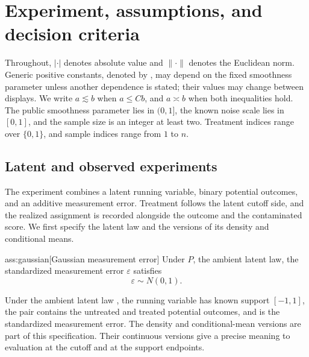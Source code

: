 \section{Experiment, assumptions, and decision criteria}

Throughout, \(\lvert\cdot\rvert\) denotes absolute value and \(\|\cdot\|\) denotes the Euclidean norm. Generic positive constants, denoted by , may depend on the fixed smoothness parameter unless another dependence is stated; their values may change between displays. We write \(a\lesssim b\) when \(a\le Cb\), and \(a\asymp b\) when both inequalities hold. The public smoothness parameter  lies in \((0,1]\), the known noise scale  lies in \([0,1]\), and the sample size  is an integer at least two. Treatment indices  range over \(\{0,1\}\), and sample indices  range from \(1\) to \(n\).

\subsection{Latent and observed experiments}

The experiment combines a latent running variable, binary potential outcomes, and an additive measurement error. Treatment follows the latent cutoff side, and the realized assignment is recorded alongside the outcome and the contaminated score. We first specify the latent law and the versions of its density and conditional means.

\begin{assumptionv}{ass:gaussian}[Gaussian measurement error]
Under \(P\), the ambient latent law, the standardized measurement error \(\varepsilon\) satisfies
\[
\varepsilon\sim N(0,1).
\]
\end{assumptionv}

Under the ambient latent law , the running variable  has known support \([-1,1]\), the pair  contains the untreated and treated potential outcomes, and  is the standardized measurement error. The density  and conditional-mean versions  are part of this specification. Their continuous versions give a precise meaning to evaluation at the cutoff and at the support endpoints.

